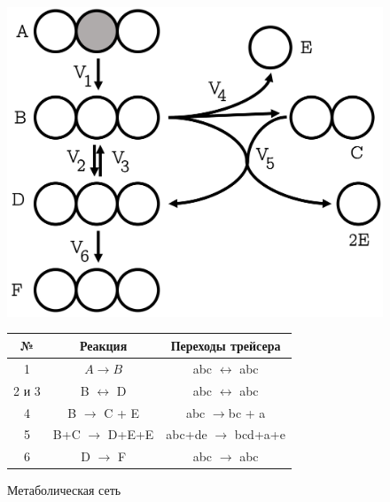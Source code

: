 \documentclass[14pt, a4paper]{extreport}
\begin{document}
\begin{figure}[h!]
	\centering
	\begin{minipage}[l]{.5\textwidth}
		\centering
		\includegraphics[scale=0.11]{full_emu_map.png}
		\caption{Метаболическая сеть}
		\label{emu_example}
	\end{minipage}%
	\begin{minipage}[r]{.5\textwidth}
		\centering
		\small
		\begin{tabular}{c c c}
			\hline
			№ & Реакция & Переходы трейсера\\
			\hline
			1 & $A \to B$ & abc $\leftrightarrow$ abc\\
			2 и 3 & B $\leftrightarrow$ D & abc $\leftrightarrow$ abc\\
			4 & B $\to$ C + E & abc $\to$bc + a\\
			5 & B+C $\to$ D+E+E & abc+de $\to$ bcd+a+e\\
			6 & D $\to$ F & abc $\to$ abc\\
			\hline
		\end{tabular}
		\label{emu_example_table}
	\end{minipage}
\end{figure}
\end{document}
